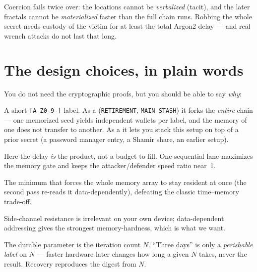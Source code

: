 \documentclass[a4paper,11pt]{report}
\begin{document}
\begin{keyidea}
Coercion fails twice over: the locations cannot be \emph{verbalized} (tacit), and
the later fractals cannot be \emph{materialized} faster than the full chain runs.
Robbing the whole secret needs custody of the victim for at least the total
Argon2 delay — and real wrench attacks do not last that long.
\end{keyidea}

\section{The design choices, in plain words}
You do not need the cryptographic proofs, but you should be able to say
\emph{why}:
\begin{description}[leftmargin=0pt,style=nextline,nosep]
\item[Stage 0 = salt \emph{or} pepper.] A short \texttt{[A-Z0-9-]} label.
As a  (\texttt{RETIREMENT}, \texttt{MAIN-STASH}) it forks the
\emph{entire} chain — one memorized seed yields independent wallets per label,
and the memory of one does not transfer to another. As a  it lets
you stack this setup on top of a prior secret (a password manager entry, a Shamir
share, an earlier \GW{} setup).
\item[$p=1$ (no parallel lanes).] Here the delay \emph{is} the product, not a
budget to fill. One sequential lane maximizes the memory gate and keeps the
attacker/defender speed ratio near~1.
\item[$t=2$ (two passes).] The minimum that forces the whole memory array to stay
resident at once (the second pass re-reads it data-dependently), defeating the
classic time--memory trade-off.
\item[Argon2d (data-dependent).] Side-channel resistance is irrelevant on your
own device; data-dependent addressing gives the strongest memory-hardness, which
is what we want.
\item[Remember $N$, not ``hours.''] The durable parameter is the iteration count
$N$. ``Three days'' is only a \emph{perishable label} on $N$ — faster hardware
later changes how long a given $N$ takes, never the result. Recovery reproduces
the digest from $N$.
\end{description}

\end{document}
